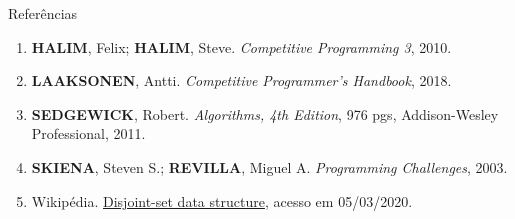 \begin{frame}[fragile]{Referências}

    \begin{enumerate}
        \item \textbf{HALIM}, Felix; \textbf{HALIM}, Steve. \textit{Competitive Programming 3}, 2010.
        \item \textbf{LAAKSONEN}, Antti. \textit{Competitive Programmer's Handbook}, 2018.

        \item \textbf{SEDGEWICK}, Robert. \textit{Algorithms, 4th Edition}, 976 pgs, Addison-Wesley
            Professional, 2011.

        \item \textbf{SKIENA}, Steven S.; \textbf{REVILLA}, Miguel A. \textit{Programming
            Challenges}, 2003.

        \item Wikipédia. \href{https://en.wikipedia.org/wiki/Disjoint-set_data_structure}
            {Disjoint-set data structure}, acesso em 05/03/2020.

    \end{enumerate}

\end{frame}

